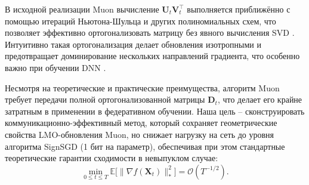 \documentclass{article}
\begin{document}
В исходной реализации Muon вычисление $\mathbf{U}_t\mathbf{V}_t^\top$ выполняется приближённо с помощью итераций Ньютона-Шульца и других полиномиальных схем, что позволяет эффективно ортогонализовать матрицу без явного вычисления SVD \cite{amsel2025polar, li2025note, liu2025muon}. Интуитивно такая ортогонализация делает обновления изотропными и предотвращает доминирование нескольких направлений градиента, что особенно важно при обучении DNN \cite{bernstein2024old, shah2025practical}.



Несмотря на теоретические и практические преимущества, алгоритм Muon требует передачи полной ортогонализованной матрицы $\mathbf{D}_t$, что делает его крайне затратным в применении в федеративном обучении. Наша цель -- сконструировать коммуникационно-эффективный метод, который сохраняет геометрические свойства LMO-обновления Muon, но снижает нагрузку на сеть до уровня алгоритма SignSGD (1 бит на параметр), обеспечивая при этом стандартные теоретические гарантии сходимости в невыпуклом случае:
\begin{equation}
\min_{0 \le t \le T}\mathbb{E}\bigl[\|\nabla f(\mathbf{X}_t)\|_*^2\bigr] = \mathcal{O}(T^{-1/2}).
\end{equation}
\end{document}
